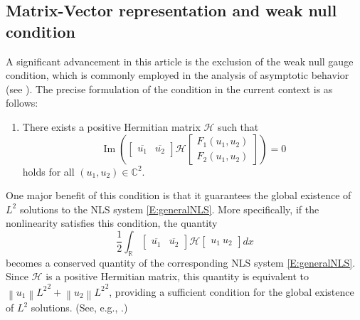 \documentclass[11pt,a4paper,oneside]{amsart}
\theoremstyle{plain}
\theoremstyle{remark}
\numberwithin{equation}{section}
\newcommand{\C}{\mathbb{C}}
\newcommand{\R}{\mathbb{R}}
\renewcommand{\Im}{\operatorname{Im}}
\newcommand{\norm}[1]{\left\lVert #1\right\rVert}
\def\({\left(}
\def\){\right)}
\theoremstyle{definition}
\begin{document}
\subsection{Matrix-Vector representation and weak null condition}

A significant advancement in this article is the exclusion of the weak null gauge condition, which is commonly employed in the analysis of asymptotic behavior (see \cite{NST,KS,M3,U}).
The precise formulation of the condition in the current context is as follows:
\begin{enumerate}
\item[(H0)]
There exists a
positive Hermitian matrix $\mathscr{H}$ such that
\[
	\Im \(\begin{bmatrix} 
	\overline{u_1} & \overline{u_2} 
	\end{bmatrix}
	\mathscr{H}
	\begin{bmatrix}
	F_1 (u_1,u_2) \\
	F_2 (u_1,u_2)
	\end{bmatrix}
	\)
	=0
\]
holds for all $(u_1,u_2) \in \C^2$.
\end{enumerate}
One major benefit of this condition is that it guarantees the global existence of $L^2$ solutions to the NLS system \eqref{E:generalNLS}.
More specifically, if the nonlinearity satisfies this condition, the quantity
\begin{equation}\label{E:nullmass}
\frac12 \int_\R \begin{bmatrix} \overline{u_1} & \overline{u_2} \end{bmatrix} \mathscr{H} \begin{bmatrix} u_1 \ u_2 \end{bmatrix} dx
\end{equation}
becomes a conserved quantity of the corresponding NLS system \eqref{E:generalNLS}.
Since $\mathscr{H}$ is a positive Hermitian matrix, this quantity is equivalent to $\norm{u_1}{L^2}^2 + \norm{u_2}{L^2}^2$, providing a sufficient condition for the global existence of $L^2$ solutions. (See, e.g., \cite{CazBook}.)
\end{document}

